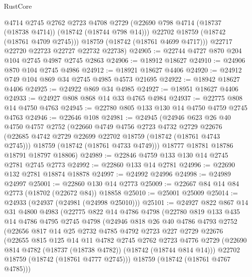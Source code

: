 \begin{lexlean}{RustCore}
\begin{coremodule}
          @4714
          @2745
          @2762
          @2723
          @4708
          @2729
          (@22690 @798 @4714 (@18737 (@18738 @4714)) (@18742 (@18744 @798 @14)))
          @22702
          @18759
          (@18742 (@18761 @4709 @2745)))
        @18759
        (@18742 (@18761 @4699 @4717)))
      @22717
      @22720
      @22723
      @22727
      @22732
      @22738)
@24905 := @22744 @4727 @870 @204 @104 @2745 @4987 @2745 @2863
@24906 := @18912 @18627
@24910 := @24906 @870 @104 @2745 @4986
@24912 := @18921 @18627 @4406
@24920 := @24912 @749 @104 @869 @34 @2745 @4985 @4573 @21695
@24922 := @18942 @18627 @4406
@24925 := @24922 @869 @34 @4985
@24927 := @18951 @18627 @4406
@24933 := @24927 @808 @868 @14 @33 @4765 @4984
@24937 := @22775 @808 @14 @4750 @4763
@24945 := @22780 @805 @133 @130 @14 @4750 @4759 @2745 @4763
@24946 := @22646 @108
@24981 := @24945
    (@24946
      @623
      @26
      @40
      @4750
      @4757
      @2752
      (@22660
        @4749
        @4756
        @2723
        @4732
        @2729
        @22676
        (@22685 @4742 @2729 @22699 @22702 @18759 (@18742 (@18761 @4743 @2745)))
        @18759
        (@18742 (@18761 @4733 @4749)))
      @18777
      @18781
      @18786
      @18791
      @18797
      @18806)
@24989 := @22846 @4759 @133 @130 @14 @2745 @2781 @2745 @2773
@24992 := @22860 @133 @14 @2781
@24996 := @22690 @132 @2781 @18874 @18878
@24997 := @24992 @24996
@24998 := @24989 @24997
@25001 := @22860 @130 @14 @2773
@25009 := @22667 @84 @14 @84 @2773 (@18702 (@22672 @84)) @18858
@25010 := @25001 @25009
@25014 := @24933 (@24937 (@24981 (@24998 @25010)))
@25101 := @24927
    @822
    @867
    @14
    @31
    @4800
    @4983
    (@22775
      @822
      @14
      @4786
      @4798
      (@22780
        @819
        @133
        @435
        @14
        @4786
        @4795
        @2745
        @4798
        (@24946
          @818
          @26
          @40
          @4786
          @4793
          @2752
          (@22656
            @817
            @14
            @25
            @2732
            @4785
            @4792
            @2723
            @227
            @2729
            @22676
            (@22655
              @815
              @125
              @14
              @11
              @4782
              @2745
              @2762
              @2723
              @4776
              @2729
              (@22690 @814 @4782 (@18737 (@18738 @4782)) (@18742 (@18744 @814 @14)))
              @22702
              @18759
              (@18742 (@18761 @4777 @2745)))
            @18759
            (@18742 (@18761 @4767 @4785)))

\end{coremodule}
\end{lexlean}
